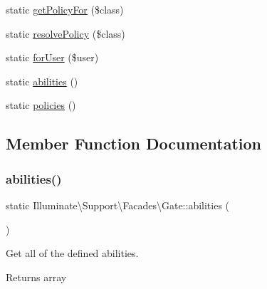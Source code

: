 \begin{DoxyCompactItemize}
\item 
static \mbox{\hyperlink{class_illuminate_1_1_support_1_1_facades_1_1_gate_a7c55d413c035d9f7c98f1c232af55b0a}{get\+Policy\+For}} (\$class)
\item 
static \mbox{\hyperlink{class_illuminate_1_1_support_1_1_facades_1_1_gate_a542f4d3d4a305070120eff8cd3740a2b}{resolve\+Policy}} (\$class)
\item 
static \mbox{\hyperlink{class_illuminate_1_1_support_1_1_facades_1_1_gate_a0dfe7611e3fa83b7964a15b2995c8771}{for\+User}} (\$user)
\item 
static \mbox{\hyperlink{class_illuminate_1_1_support_1_1_facades_1_1_gate_ae4c194dfa7fc3157b19cfdd34a9eb989}{abilities}} ()
\item 
static \mbox{\hyperlink{class_illuminate_1_1_support_1_1_facades_1_1_gate_a2ef6d819da6742b6b4d12236517c4928}{policies}} ()
\end{DoxyCompactItemize}


\subsection{Member Function Documentation}
\mbox{\label{class_illuminate_1_1_support_1_1_facades_1_1_gate_ae4c194dfa7fc3157b19cfdd34a9eb989}} 
\subsubsection{\texorpdfstring{abilities()}{abilities()}}
{\footnotesize\ttfamily static Illuminate\textbackslash{}\+Support\textbackslash{}\+Facades\textbackslash{}\+Gate\+::abilities (\begin{DoxyParamCaption}{ }\end{DoxyParamCaption})\hspace{0.3cm}{\ttfamily [static]}}

Get all of the defined abilities.

\begin{DoxyReturn}{Returns}
array 
\end{DoxyReturn}
\mbox{\label{class_illuminate_1_1_support_1_1_facades_1_1_gate_a18080477d595d620db9332f9d829503a}} 
